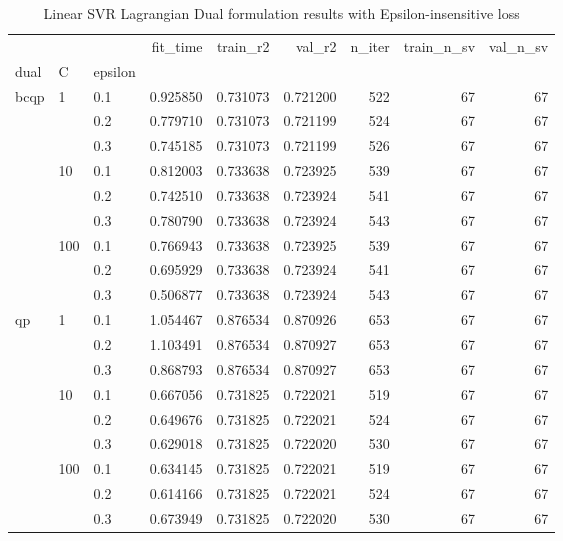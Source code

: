 \begin{table}[h!]
\centering
\caption{Linear SVR Lagrangian Dual formulation results with Epsilon-insensitive loss}
\label{linear_lagrangian_dual_svr_cv_results}
\begin{tabular}{lllrrrrrr}
\toprule
   &     &     &  fit\_time &  train\_r2 &    val\_r2 &  n\_iter &  train\_n\_sv &  val\_n\_sv \\
dual & C & epsilon &           &           &           &         &             &           \\
\midrule
bcqp & 1   & 0.1 &  0.925850 &  0.731073 &  0.721200 &     522 &          67 &        67 \\
   &     & 0.2 &  0.779710 &  0.731073 &  0.721199 &     524 &          67 &        67 \\
   &     & 0.3 &  0.745185 &  0.731073 &  0.721199 &     526 &          67 &        67 \\
   & 10  & 0.1 &  0.812003 &  0.733638 &  0.723925 &     539 &          67 &        67 \\
   &     & 0.2 &  0.742510 &  0.733638 &  0.723924 &     541 &          67 &        67 \\
   &     & 0.3 &  0.780790 &  0.733638 &  0.723924 &     543 &          67 &        67 \\
   & 100 & 0.1 &  0.766943 &  0.733638 &  0.723925 &     539 &          67 &        67 \\
   &     & 0.2 &  0.695929 &  0.733638 &  0.723924 &     541 &          67 &        67 \\
   &     & 0.3 &  0.506877 &  0.733638 &  0.723924 &     543 &          67 &        67 \\
qp & 1   & 0.1 &  1.054467 &  0.876534 &  0.870926 &     653 &          67 &        67 \\
   &     & 0.2 &  1.103491 &  0.876534 &  0.870927 &     653 &          67 &        67 \\
   &     & 0.3 &  0.868793 &  0.876534 &  0.870927 &     653 &          67 &        67 \\
   & 10  & 0.1 &  0.667056 &  0.731825 &  0.722021 &     519 &          67 &        67 \\
   &     & 0.2 &  0.649676 &  0.731825 &  0.722021 &     524 &          67 &        67 \\
   &     & 0.3 &  0.629018 &  0.731825 &  0.722020 &     530 &          67 &        67 \\
   & 100 & 0.1 &  0.634145 &  0.731825 &  0.722021 &     519 &          67 &        67 \\
   &     & 0.2 &  0.614166 &  0.731825 &  0.722021 &     524 &          67 &        67 \\
   &     & 0.3 &  0.673949 &  0.731825 &  0.722020 &     530 &          67 &        67 \\
\bottomrule
\end{tabular}
\end{table}
